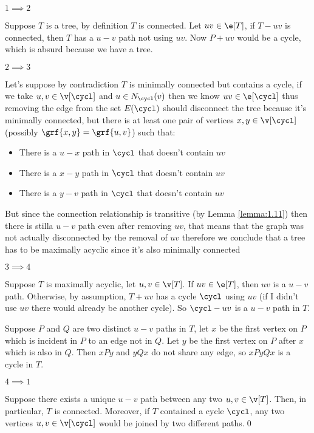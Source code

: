 \begin{prf}
    \boldmath$1 \implies 2$\unboldmath

    Suppose $T$ is a tree, by definition $T$ is connected. Let $uv \in \e[T]$, if $T - uv$ is connected, then $T$ has a $u - v$ path not using $uv$. Now $P + uv$ would be a cycle, which is absurd because we have a tree.

    \boldmath$2 \implies 3$\unboldmath

    Let's suppose by contradiction $T$ is minimally connected but contains a cycle, if we take $u, v \in \v[\cycl]$ and $u \in N_{\cycl}(v)$ then we know $uv \in \e[\cycl]$ thus removing the edge from the set $E(\cycl)$ should disconnect the tree because it's minimally connected, but there is at least one pair of vertices $x, y \in \v[\cycl]$ (possibly $\grf{x, y} = \grf{u, v}$) such that:
    \begin{itemize}
        \item There is a $u - x$ path in $\cycl$ that doesn't contain $uv$
        \item There is a $x - y$ path in $\cycl$ that doesn't contain $uv$
        \item There is a $y - v$ path in $\cycl$ that doesn't contain $uv$
    \end{itemize}
    But since the connection relationship is transitive (by Lemma \ref{lemma:1.11}) then there is stilla $u - v$ path even after removing $uv$, that means that the graph was not actually disconnected by the removal of $uv$ therefore we conclude that a tree has to be maximally acyclic since it's also minimally connected

    \boldmath$3 \implies 4$\unboldmath

    Suppose $T$ is maximally acyclic, let $u, v \in \v[T]$. If $uv \in \e[T]$, then $uv$ is a $u - v$ path. Otherwise, by assumption, $T + uv$ has a cycle $\cycl$ using $uv$ (if I didn't use $uv$ there would already be another cycle). So $\cycl - uv$ is a $u - v$ path in $T$.

    Suppose $P$ and $Q$ are two distinct $u - v$ paths in $T$, let $x$ be the first vertex on $P$ which is incident in $P$ to an edge not in $Q$. Let $y$ be the first vertex on $P$ after $x$ which is also in $Q$. Then $xPy$ and $yQx$ do not share any edge, so $xPyQx$ is a cycle in $T$.

    \boldmath$4 \implies 1$\unboldmath

    Suppose there exists a unique $u - v$ path between any two $u, v \in \v[T]$. Then, in particular, $T$ is connected. Moreover, if $T$ contained a cycle $\cycl$, any two vertices $u, v \in \v[\cycl]$ would be joined by two different paths.\qed
\end{prf}
